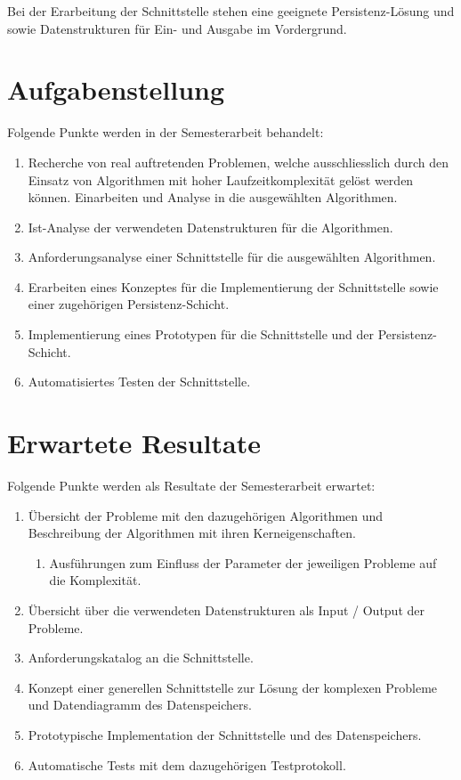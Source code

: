 Bei der Erarbeitung der Schnittstelle stehen eine geeignete Persistenz-Lösung und sowie Datenstrukturen für Ein- und Ausgabe im Vordergrund.

\section{Aufgabenstellung}\label{aufgabenstellung}
Folgende Punkte werden in der Semesterarbeit behandelt:
\begin{enumerate}
\item Recherche von real auftretenden Problemen, welche ausschliesslich durch den Einsatz von Algorithmen mit hoher Laufzeitkomplexität gelöst werden können. Einarbeiten und Analyse in die ausgewählten Algorithmen.
\item Ist-Analyse der verwendeten Datenstrukturen für die Algorithmen.
\item Anforderungsanalyse einer Schnittstelle für die ausgewählten Algorithmen.
\item Erarbeiten eines Konzeptes für die Implementierung der Schnittstelle sowie einer zugehörigen Persistenz-Schicht.
\item Implementierung eines Prototypen für die Schnittstelle und der Persistenz-Schicht.
\item Automatisiertes Testen der Schnittstelle.
\end{enumerate}

\section{Erwartete Resultate}\label{erwartete_resultate}
Folgende Punkte werden als Resultate der Semesterarbeit erwartet:
\begin{enumerate}
\item Übersicht der Probleme mit den dazugehörigen Algorithmen und Beschreibung der Algorithmen mit ihren Kerneigenschaften.
      \begin{enumerate}
        \item Ausführungen zum Einfluss der Parameter der jeweiligen Probleme auf die Komplexität.
      \end{enumerate}
\item Übersicht über die verwendeten Datenstrukturen als Input / Output der Probleme.
\item Anforderungskatalog an die Schnittstelle.
\item Konzept einer generellen Schnittstelle zur Lösung der komplexen Probleme und Datendiagramm des Datenspeichers.
\item Prototypische Implementation der Schnittstelle und des Datenspeichers.
\item Automatische Tests mit dem dazugehörigen Testprotokoll.
\end{enumerate}

